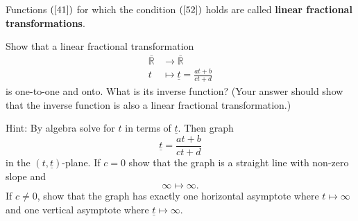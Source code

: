 



\begin{definition}
Functions $\left( \ref{41}\right) $ for which the condition $\left(
\ref{52}\right)  $ holds are called \textbf{linear fractional transformations}.
\end{definition}


\begin{exercise}
Show that a linear fractional transformation%
\begin{align*}
\overline{\mathbb{R}} &\rightarrow\overline{\mathbb{R}}\\
t &\mapsto\underline{t} =\frac{at+b}{ct+d}%
\end{align*}
is one-to-one and onto. What is its inverse function? (Your answer should show that
the inverse function is also a linear fractional transformation.)

Hint: By algebra solve for $t$ in terms of $\underline{t}$. Then graph%
\[
\underline{t}=\frac{at+b}{ct+d}%
\]
in the $\left(  t,\underline{t}\right)  $-plane. If $c=0$ show that the graph
is a straight line with non-zero slope and%
\[
\infty\mapsto\infty.
\]
If $c\neq0$, show that the graph has exactly one horizontal asymptote where
$t\mapsto\infty$ and one vertical asymptote where $\underline{t}\mapsto\infty$.

\begin{solution}
\end{solution}
\end{exercise}







